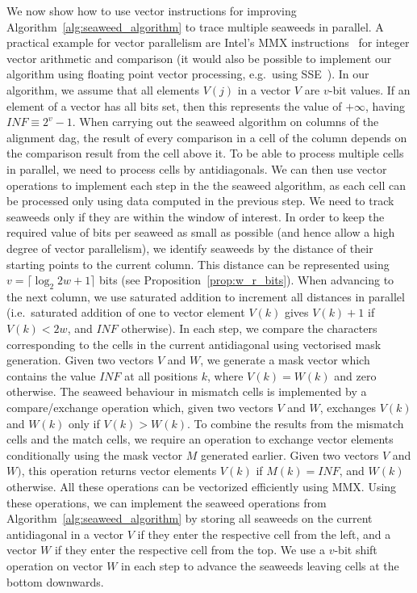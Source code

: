 \documentclass{IOS-Book-Article}     \usepackage{amsmath}
\theoremstyle{plain}
\theoremstyle{definition}
\begin{document}
We now show how to use vector instructions for improving
Algorithm~\ref{alg:seaweed_algorithm} to trace multiple seaweeds in
parallel. 
A practical example for vector parallelism are Intel's MMX
instructions~\cite{Intel:09} for integer vector
arithmetic and comparison (it
would also be possible to implement our algorithm using floating point vector
processing, e.g.\ using SSE~\cite{Intel:09}).
In our algorithm, we assume that all elements $V(j)$ in a vector $V$ are $v$-bit
values. If an element of a vector has all bits set, then this represents the
value of $+\infty$, having $\mathit{INF} \equiv 2^v - 1$.
When carrying out the seaweed algorithm on columns of the alignment dag, 
the result of every comparison in a cell of the column depends on the
comparison result from the cell above it. To be able to process multiple cells
in parallel, we need to process cells by antidiagonals. 
We can then use vector operations to implement each step in the the seaweed
algorithm, as each cell can be processed only using data computed in the previous step.
We need to track seaweeds only if they are within the window of interest. In
order to keep the required value of bits per seaweed as small as possible (and
hence allow a high degree of vector parallelism), we identify seaweeds by the distance of their
starting points to the current column. This distance can be represented using
$v = \lceil \log_2 2w+1 \rceil$ bits (see Proposition~\ref{prop:w_r_bits}).
When advancing to the next column, we use saturated addition to
increment all distances in parallel
(i.e.\ saturated addition of one to vector element ${V}(k)$ gives ${V}(k) + 1$
if $V(k) < 2w$, and $\mathit{INF}$ otherwise).
In each step, we compare the characters corresponding to the cells in the
current antidiagonal using vectorised mask generation. Given two vectors ${V}$
and ${W}$, we generate a mask vector which contains the value $\mathit{INF}$ at
all positions $k$, where ${V}(k) = {W}(k)$ and zero otherwise. 
The seaweed behaviour in mismatch cells is implemented by a compare/exchange
operation which, given two vectors ${V}$ and ${W}$, exchanges ${V}(k)$ and
${W}(k)$ only if ${V}(k) > {W}(k)$. 
To combine the results from the mismatch cells and the match cells, we
require an operation to exchange vector elements conditionally using the mask
vector $M$ generated earlier. Given two vectors ${V}$
and ${W})$, this operation returns vector elements ${V}(k)$ if ${M}(k)
= \mathit{INF}$, and ${W}(k)$ otherwise. 
All these operations can be vectorized efficiently using MMX. Using these
operations, we can implement the seaweed operations from
Algorithm~\ref{alg:seaweed_algorithm} by storing all seaweeds on the current
antidiagonal in a vector $V$ if they enter the respective cell from the left,
and a vector $W$ if they enter the respective cell from the top. We use a
$v$-bit shift operation on vector $W$ in each step to advance the seaweeds
leaving cells at the bottom downwards.
 
\end{document}
